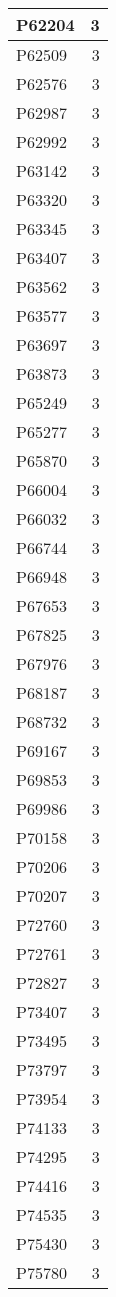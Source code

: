 \documentclass[
]{book}
\theoremstyle{definition}
\theoremstyle{definition}
\theoremstyle{definition}
\theoremstyle{definition}
\theoremstyle{remark}
\begin{document}
\begin{table}
\begin{tabular}{l|r}
\hline
P62204 & 3\\
\hline
P62509 & 3\\
\hline
P62576 & 3\\
\hline
P62987 & 3\\
\hline
P62992 & 3\\
\hline
P63142 & 3\\
\hline
P63320 & 3\\
\hline
P63345 & 3\\
\hline
P63407 & 3\\
\hline
P63562 & 3\\
\hline
P63577 & 3\\
\hline
P63697 & 3\\
\hline
P63873 & 3\\
\hline
P65249 & 3\\
\hline
P65277 & 3\\
\hline
P65870 & 3\\
\hline
P66004 & 3\\
\hline
P66032 & 3\\
\hline
P66744 & 3\\
\hline
P66948 & 3\\
\hline
P67653 & 3\\
\hline
P67825 & 3\\
\hline
P67976 & 3\\
\hline
P68187 & 3\\
\hline
P68732 & 3\\
\hline
P69167 & 3\\
\hline
P69853 & 3\\
\hline
P69986 & 3\\
\hline
P70158 & 3\\
\hline
P70206 & 3\\
\hline
P70207 & 3\\
\hline
P72760 & 3\\
\hline
P72761 & 3\\
\hline
P72827 & 3\\
\hline
P73407 & 3\\
\hline
P73495 & 3\\
\hline
P73797 & 3\\
\hline
P73954 & 3\\
\hline
P74133 & 3\\
\hline
P74295 & 3\\
\hline
P74416 & 3\\
\hline
P74535 & 3\\
\hline
P75430 & 3\\
\hline
P75780 & 3\\

\end{tabular}
\end{table}
\end{document}
